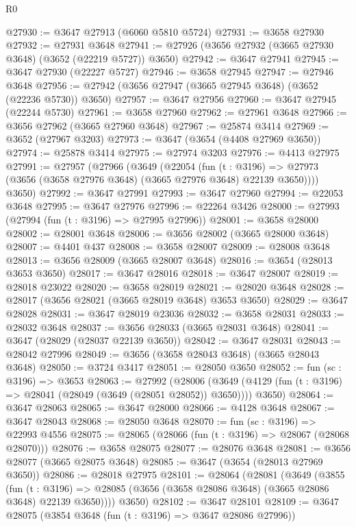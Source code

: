 \begin{lexlean}{R0}
\begin{coremodule}
@27930 := @3647 @27913 (@6060 @5810 @5724)
@27931 := @3658 @27930
@27932 := @27931 @3648
@27941 := @27926 (@3656 @27932 (@3665 @27930 @3648) (@3652 (@22219 @5727)) @3650)
@27942 := @3647 @27941
@27945 := @3647 @27930 (@22227 @5727)
@27946 := @3658 @27945
@27947 := @27946 @3648
@27956 := @27942 (@3656 @27947 (@3665 @27945 @3648) (@3652 (@22236 @5730)) @3650)
@27957 := @3647 @27956
@27960 := @3647 @27945 (@22244 @5730)
@27961 := @3658 @27960
@27962 := @27961 @3648
@27966 := @3656 @27962 (@3665 @27960 @3648)
@27967 := @25874 @3414
@27969 := @3652 (@27967 @3203)
@27973 := @3647 (@3654 (@4408 @27969 @3650))
@27974 := @25878 @3414
@27975 := @27974 @3203
@27976 := @4413 @27975
@27991 := @27957
    (@27966
      (@3649
        (@22054
          (fun (t : @3196) =>
          @27973 (@3656 (@3658 @27976 @3648) (@3665 @27976 @3648) @22139 @3650))))
      @3650)
@27992 := @3647 @27991
@27993 := @3647 @27960
@27994 := @22053 @3648
@27995 := @3647 @27976
@27996 := @22264 @3426
@28000 := @27993 (@27994 (fun (t : @3196) => @27995 @27996))
@28001 := @3658 @28000
@28002 := @28001 @3648
@28006 := @3656 @28002 (@3665 @28000 @3648)
@28007 := @4401 @437
@28008 := @3658 @28007
@28009 := @28008 @3648
@28013 := @3656 @28009 (@3665 @28007 @3648)
@28016 := @3654 (@28013 @3653 @3650)
@28017 := @3647 @28016
@28018 := @3647 @28007
@28019 := @28018 @23022
@28020 := @3658 @28019
@28021 := @28020 @3648
@28028 := @28017 (@3656 @28021 (@3665 @28019 @3648) @3653 @3650)
@28029 := @3647 @28028
@28031 := @3647 @28019 @23036
@28032 := @3658 @28031
@28033 := @28032 @3648
@28037 := @3656 @28033 (@3665 @28031 @3648)
@28041 := @3647 (@28029 (@28037 @22139 @3650))
@28042 := @3647 @28031
@28043 := @28042 @27996
@28049 := @3656 (@3658 @28043 @3648) (@3665 @28043 @3648)
@28050 := @3724 @3417
@28051 := @28050 @3650
@28052 := fun (sc : @3196) => @3653
@28063 := @27992
    (@28006
      (@3649 (@4129 (fun (t : @3196) => @28041 (@28049 (@3649 (@28051 @28052)) @3650))))
      @3650)
@28064 := @3647 @28063
@28065 := @3647 @28000
@28066 := @4128 @3648
@28067 := @3647 @28043
@28068 := @28050 @3648
@28070 := fun (sc : @3196) => @22993 @4556
@28075 := @28065 (@28066 (fun (t : @3196) => @28067 (@28068 @28070)))
@28076 := @3658 @28075
@28077 := @28076 @3648
@28081 := @3656 @28077 (@3665 @28075 @3648)
@28085 := @3647 (@3654 (@28013 @27969 @3650))
@28086 := @28018 @27975
@28101 := @28064
    (@28081
      (@3649
        (@3855
          (fun (t : @3196) =>
          @28085 (@3656 (@3658 @28086 @3648) (@3665 @28086 @3648) @22139 @3650))))
      @3650)
@28102 := @3647 @28101
@28109 := @3647 @28075 (@3854 @3648 (fun (t : @3196) => @3647 @28086 @27996))

\end{coremodule}
\end{lexlean}
